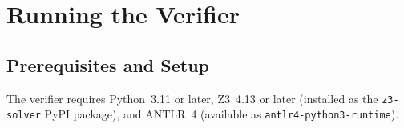 

\section*{Running the Verifier}

\subsection*{Prerequisites and Setup}

The verifier requires Python~3.11 or later, Z3~4.13 or later (installed as the \texttt{z3-solver} PyPI package), and ANTLR~4 (available as \texttt{antlr4-python3-runtime}).

